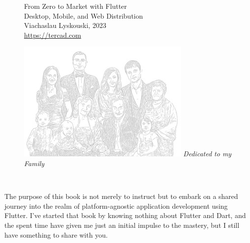 
\thispagestyle{empty}

\begin{figure}
  \begin{minipage}{0.59\textwidth}
    \large From Zero to Market with Flutter\\
    \vspace{9mm}
    \noindent \small Desktop, Mobile, and Web Distribution\\
    \vspace{10mm}
    Viachaslau Lyskouski, 2023\\
    \href{https://tercad.com}{https://tercad.com}\\
    \vspace{2mm}
  \end{minipage}
  \hfill
  \begin{minipage}{0.31\textwidth}
    \includegraphics[width=\textwidth]{_cover/to.jpg}
    \emph{Dedicated to my Family}\\
  \end{minipage}
\end{figure}
~
\vspace{3cm}

\noindent The purpose of this book is not merely to instruct but to embark on a shared journey into the realm of 
platform-agnostic application development using Flutter. I've started that book by knowing nothing about Flutter and 
Dart, and the spent time have given me just an initial impulse to the mastery, but I still have something to share with 
you. 

